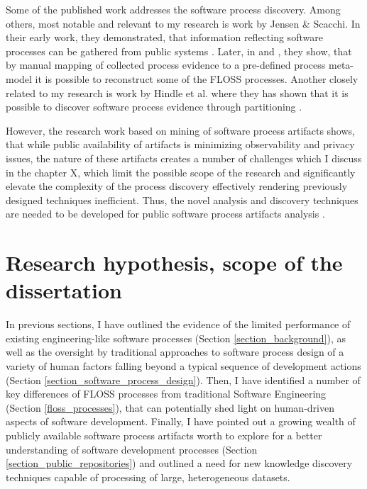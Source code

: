 Some of the published work addresses the software process discovery. Among others, most notable and 
relevant to my research is work by Jensen \& Scacchi. In their early work, they demonstrated, that 
information reflecting software processes can be gathered from public systems \cite{citeulike:12550640}. 
Later, in \cite{citeulike:5043664} and \cite{citeulike:5128808}, they show, that by manual mapping of 
collected process evidence to a pre-defined process meta-model it is possible to reconstruct some 
of the FLOSS processes. 
Another closely related to my research is work by Hindle et al. where they has shown that it is possible to 
discover software process evidence through partitioning \cite{citeulike:10377366}.

However, the research work based on mining of software process artifacts shows, that while public availability 
of artifacts is minimizing observability and privacy issues, the nature of these artifacts creates a number of 
challenges which I discuss in the chapter X, which limit the possible scope of the research and significantly 
elevate the complexity of the process discovery effectively rendering previously designed techniques inefficient.
Thus, the novel analysis and discovery techniques are needed to be developed for public software process artifacts 
analysis \cite{citeulike:7853299}.

%
%
\section{Research hypothesis, scope of the dissertation}\label{section_research_hypothesis}
In previous sections, I have outlined the evidence of the limited performance of existing engineering-like 
software processes (Section \ref{section_background}),
as well as the oversight by traditional approaches to software process design 
of a variety of human factors falling beyond a typical sequence of development actions  
(Section \ref{section_software_process_design}).
Then, I have identified a number of key differences of FLOSS processes from traditional Software Engineering 
(Section \ref{floss_processes}), that can potentially shed light on human-driven aspects of software development.
Finally, I have pointed out a growing wealth of publicly available software process artifacts worth to explore 
for a better understanding of software development processes (Section \ref{section_public_repositories}) and 
outlined a need for new knowledge discovery techniques capable of processing of large, heterogeneous datasets.


